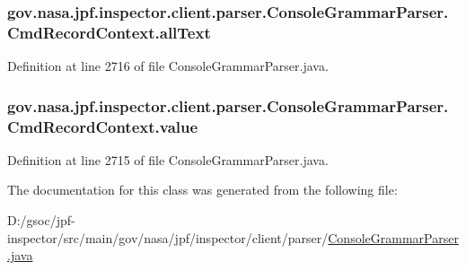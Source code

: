 \subsubsection[{\texorpdfstring{all\+Text}{allText}}]{ gov.\+nasa.\+jpf.\+inspector.\+client.\+parser.\+Console\+Grammar\+Parser.\+Cmd\+Record\+Context.\+all\+Text}\hypertarget{classgov_1_1nasa_1_1jpf_1_1inspector_1_1client_1_1parser_1_1_console_grammar_parser_1_1_cmd_record_context_a09b65c3a26162fc81f7828901a1bf906}{}\label{classgov_1_1nasa_1_1jpf_1_1inspector_1_1client_1_1parser_1_1_console_grammar_parser_1_1_cmd_record_context_a09b65c3a26162fc81f7828901a1bf906}


Definition at line 2716 of file Console\+Grammar\+Parser.\+java.

\subsubsection[{\texorpdfstring{value}{value}}]{ gov.\+nasa.\+jpf.\+inspector.\+client.\+parser.\+Console\+Grammar\+Parser.\+Cmd\+Record\+Context.\+value}\hypertarget{classgov_1_1nasa_1_1jpf_1_1inspector_1_1client_1_1parser_1_1_console_grammar_parser_1_1_cmd_record_context_a1ffc62df19c5063fd200d75cbd2f1e94}{}\label{classgov_1_1nasa_1_1jpf_1_1inspector_1_1client_1_1parser_1_1_console_grammar_parser_1_1_cmd_record_context_a1ffc62df19c5063fd200d75cbd2f1e94}


Definition at line 2715 of file Console\+Grammar\+Parser.\+java.



The documentation for this class was generated from the following file\+:\begin{DoxyCompactItemize}
\item 
D\+:/gsoc/jpf-\/inspector/src/main/gov/nasa/jpf/inspector/client/parser/\hyperlink{_console_grammar_parser_8java}{Console\+Grammar\+Parser.\+java}\end{DoxyCompactItemize}
